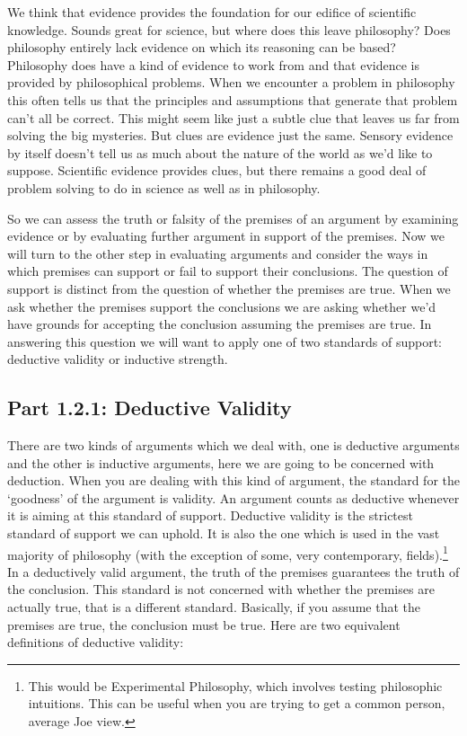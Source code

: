 We think that evidence provides the foundation for our edifice of scientific knowledge. Sounds great for science, but where does this leave philosophy? Does philosophy entirely lack evidence on which its reasoning can be based? Philosophy does have a kind of evidence to work from and that evidence is provided by philosophical problems. When we encounter a problem in philosophy this often tells us that the principles and assumptions that generate that problem can’t all be correct. This might seem like just a subtle clue that leaves us far from solving the big mysteries. But clues are evidence just the same. Sensory evidence by itself doesn’t tell us as much about the nature of the world as we’d like to suppose. Scientific evidence provides clues, but there remains a good deal of problem solving to do in science as well as in philosophy.

So we can assess the truth or falsity of the premises of an argument by examining evidence or by evaluating further argument in support of the premises. Now we will turn to the other step in evaluating arguments and consider the ways in which premises can support or fail to support their conclusions. The question of support is distinct from the question of whether the premises are true. When we ask whether the premises support the conclusions we are asking whether we’d have grounds for accepting the conclusion assuming the premises are true. In answering this question we will want to apply one of two standards of support: deductive validity or inductive strength.

\subsection{Part 1.2.1: Deductive Validity}
\label{s:p1.2.1}
There are two kinds of arguments which we deal with, one is \glspl{deductive argument} and the other is inductive arguments, here we are going to be concerned with deduction. When you are dealing with this kind of argument, the standard for the `goodness' of the argument is validity. An argument counts as deductive whenever it is aiming at this standard of support. Deductive validity is the strictest standard of support we can uphold. It is also the one which is used in the vast majority of philosophy (with the exception of some, very contemporary, fields).\footnote{This would be Experimental Philosophy, which involves testing philosophic intuitions. This can be useful when you are trying to get a common person, average Joe view.} In a deductively \gls{valid} argument, the truth of the premises guarantees the truth of the conclusion. This standard is not concerned with whether the premises are actually true, that is a different standard. Basically, if you assume that the premises are true, the conclusion must be true. Here are two equivalent definitions of deductive validity:

